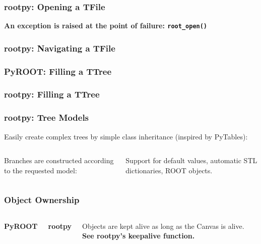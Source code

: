 \documentclass[10pt,professionalfonts,serif,usenames,dvipsnames,svgnames,table]{beamer}
\begin{document}
\begin{frame}[fragile]
    \frametitle{rootpy: Opening a TFile}

    
    \vspace{-.5cm}
    
    \begin{center}
        \vspace{-.5cm}
    {\bf An exception is raised at the point of failure:
    \verb|root_open()|}
    \end{center}
\end{frame}

\begin{frame}[fragile]
    \frametitle{rootpy: Navigating a TFile}
    
    \vspace{-.5cm}
    
\end{frame}

\begin{frame}[fragile]
    \frametitle{PyROOT: Filling a TTree}
    
\end{frame}

\begin{frame}[fragile]
    \frametitle{rootpy: Filling a TTree}
    
\end{frame}

\begin{frame}[fragile]
    \frametitle{rootpy: Tree Models}
    Easily create complex trees by simple class inheritance (inspired by
    PyTables):
    \vspace{-.6cm}
    \begin{columns}
    

    \vspace{.8cm}

    Branches are constructed according to the requested model:
    
    \vspace{-.3cm}
    Support for default values, automatic STL dictionaries, ROOT objects.
    \end{columns}
\end{frame}

\begin{frame}[fragile]
    \frametitle{Object Ownership}
    \begin{columns}
        {\bf PyROOT}
    
        {\bf rootpy}
    
    Objects are kept alive as long as the Canvas is alive. \\
    {\bf See rootpy's keepalive function.}
    \end{columns}
\end{frame}
\end{document}
